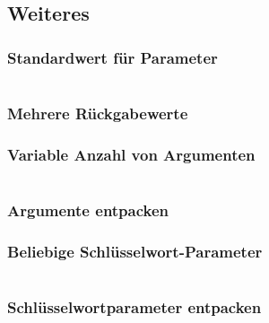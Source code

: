 \subsection{Weiteres}
\begin{minipage}[t]{0.49\textwidth}
	\subsubsection{Standardwert für Parameter}
	
\end{minipage}
\begin{minipage}[t]{0.02\textwidth} $ \quad $\end{minipage}
\begin{minipage}[t]{0.49\textwidth}
	\subsubsection{Mehrere Rückgabewerte}
	
\end{minipage}

\begin{minipage}[t]{0.49\textwidth}
	\subsubsection{Variable Anzahl von Argumenten}
	
\end{minipage}
\begin{minipage}[t]{0.02\textwidth} $ \quad $\end{minipage}
\begin{minipage}[t]{0.49\textwidth}
	\subsubsection{Argumente entpacken}
	
\end{minipage}

\begin{minipage}[t]{0.56\textwidth}
	\subsubsection{Beliebige Schlüsselwort-Parameter}
	
\end{minipage}
\begin{minipage}[t]{0.02\textwidth} $ \quad $\end{minipage}
\begin{minipage}[t]{0.42\textwidth}
	\subsubsection{Schlüsselwortparameter entpacken}
	
\end{minipage}

